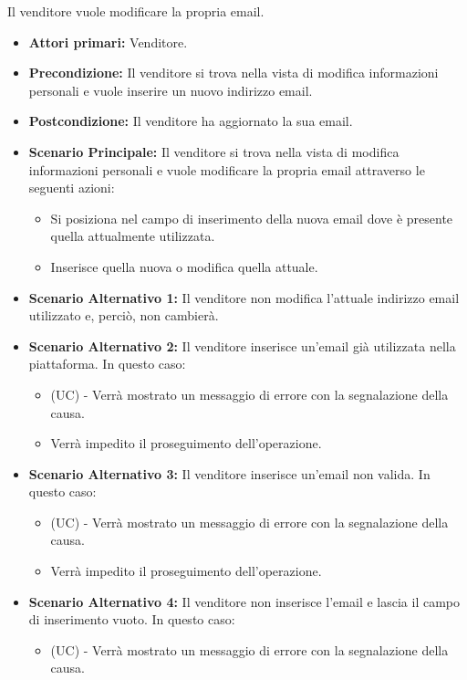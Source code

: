 Il venditore vuole modificare la propria email.
\begin{itemize}
    \item \textbf{Attori primari:} Venditore.
    \item \textbf{Precondizione:} Il venditore si trova nella vista di modifica informazioni personali e vuole inserire un nuovo indirizzo email.
    \item \textbf{Postcondizione:} Il venditore ha aggiornato la sua email.
    \item \textbf{Scenario Principale:} Il venditore si trova nella vista di modifica informazioni personali e vuole modificare la propria email attraverso le seguenti azioni:
    \begin{itemize}
        \item Si posiziona nel campo di inserimento della nuova email dove è presente quella attualmente utilizzata.
        \item Inserisce quella nuova o modifica quella attuale.
    \end{itemize}
    \item \textbf{Scenario Alternativo 1:} Il venditore non modifica l'attuale indirizzo email utilizzato e, perciò, non cambierà.
    \item \textbf{Scenario Alternativo 2:} Il venditore inserisce un'email già utilizzata nella piattaforma. In questo caso:
    \begin{itemize}
        \item (UC) - Verrà mostrato un messaggio di errore con la segnalazione della causa.
        \item Verrà impedito il proseguimento dell'operazione.
    \end{itemize}
    \item \textbf{Scenario Alternativo 3:} Il venditore inserisce un'email non valida. In questo caso:
    \begin{itemize}
        \item (UC) - Verrà mostrato un messaggio di errore con la segnalazione della causa.
        \item Verrà impedito il proseguimento dell'operazione.
    \end{itemize}
    \item \textbf{Scenario Alternativo 4:} Il venditore non inserisce l'email e lascia il campo di inserimento vuoto. In questo caso:
    \begin{itemize}
        \item (UC) - Verrà mostrato un messaggio di errore con la segnalazione della causa.

\end{itemize}
\end{itemize}
